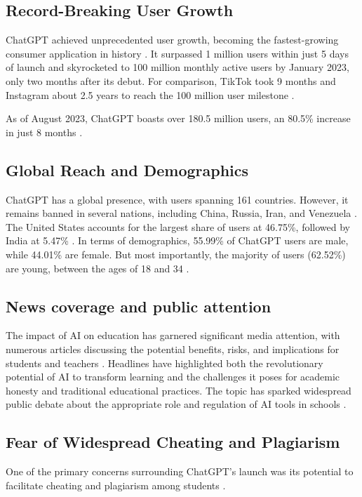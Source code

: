 \documentclass{article}
\begin{document}
\subsection{Record-Breaking User Growth}
ChatGPT achieved unprecedented user growth, becoming
the fastest-growing consumer application in history \cite{arstechnica_chatgpt_growth}.
It surpassed 1 million users within just 5 days of launch and skyrocketed to 100
million monthly active users by January 2023, only two months after its debut.
For comparison, TikTok took 9 months and Instagram about 2.5 years to reach the 100 million user milestone
\cite{arstechnica_chatgpt_growth}.

As of August 2023, ChatGPT boasts over 180.5 million users, an 80.5\% increase in just 8 months
\cite{meetanshi2023chatgpt} \cite{nerdynav_chatgpt_stats} \cite{namepepper_chatgpt_users}.


\subsection{Global Reach and Demographics}
ChatGPT has a global presence, with users spanning 161
countries. However, it remains banned in several nations,
including China, Russia, Iran, and Venezuela
\cite{investingchannel_chatgpt_bans}.
The United States accounts for the largest share of users
at 46.75\%, followed by India at 5.47\%
\cite{nerdynav_chatgpt_stats}.
In terms of demographics, 55.99\% of ChatGPT users
are male, while 44.01\% are female. But most importantly,
the majority of users (62.52\%) are young,
between the ages of 18 and 34 \cite{nerdynav_chatgpt_stats}.

\subsection{News coverage and public attention}
The impact of AI on education has garnered significant media attention,
with numerous articles discussing the potential benefits, risks,
and implications for students and teachers
\cite{bbc2023ai_education} \cite{tampabay2024ai_education} \cite{theweek2024ai_schools}.
Headlines have highlighted both the revolutionary potential of AI
to transform learning and the challenges it poses for academic
honesty and traditional educational practices. The topic has
sparked widespread public debate about the appropriate role and
regulation of AI tools in schools
\cite{tampabay2024ai_education}
\cite{theweek2024ai_schools}.

\subsection{Fear of Widespread Cheating and Plagiarism}
One of the primary concerns surrounding ChatGPT's launch
was its potential to facilitate cheating and plagiarism among students
\cite{missouri2023chatgpt} \cite{shiri2023chatgpt} \cite{reddit_chatgpt_academic_purposes}.
\end{document}
